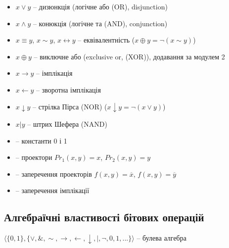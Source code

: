 \begin{enumerate}
    \begin{itemize}
        \item $x \vee y$ -- дизюнкція (логічне або (OR), disjunction)
        \item $x \wedge y$ -- конюкція (логічне та (AND), conjunction)
        \item $x \equiv y$, $x \sim y$, $x \leftrightarrow y$ -- еквівалентність ($x \oplus y = \neg (x \sim y)$)
        \item $x \oplus y$ -- виключне або (exclusive or, (XOR)), додавання за модулем 2
        \item $x \rightarrow y$ -- імплікація
        \item $x \leftarrow y$ -- зворотна імплікація
        \item $x \downarrow y$ -- стрілка Пірса (NOR) ($x \downarrow y = \neg (x \vee y)$)
        \item $x|y$ -- штрих Шефера (NAND)
        \item -- константи 0 і 1
        \item -- проектори $Pr_1(x, y) = x$, $Pr_2(x, y) = y$
        \item -- заперечення проекторів $f(x, y) = \overline{x}$, $f(x, y) = \overline{y}$
        \item -- заперечення імплікації
    \end{itemize}
\end{enumerate}

\subsection{Алгебраїчні властивості бітових операцій}

\begin{definition}
    $\langle \{0, 1\}, \{\vee, \&, \sim, \rightarrow, \leftarrow, \downarrow, |, \neg, 0, 1, ...\} \rangle$ -- булева алгебра
\end{definition}

